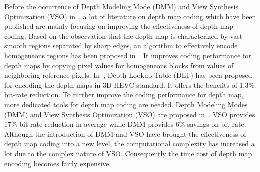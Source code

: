 Before the occurrence of Depth Modeling Mode (DMM) and
View Synthesis Optimization (VSO) in~\parencite{RN208}, a lot of literature
on depth map coding which have been published are mainly
focusing on improving the effectiveness of depth map coding.
%
Based on the observation that the depth map is characterized by vast
smooth regions separated by sharp edges, an algorithm to effectively
encode homogeneous regions has been proposed in~\parencite{RN120}.
It improves coding performance for depth maps by copying pixel values for
homogeneous blocks from values of neighboring reference pixels.
In~\parencite{RN123}, Depth Lookup Table (DLT) has been proposed for
encoding the depth maps in 3D-HEVC standard.
It offers the benefits of 1.3\% bit-rate reduction.
To further improve the coding performance for depth map, more
dedicated tools for depth map coding are needed.
Depth Modeling Modes (DMM) and View Synthesis Optimization (VSO) are proposed
in~\parencite{RN208}.
VSO provides 17\% bit rate reduction in average while DMM provides 6\% savings
on bit rate.
Although the introduction of DMM and VSO have brought the effectiveness of
depth map coding into a new level, the computational complexity has increased
a lot due to the complex nature of VSO\@.
Consequently the time cost of depth map encoding becomes fairly expensive.

